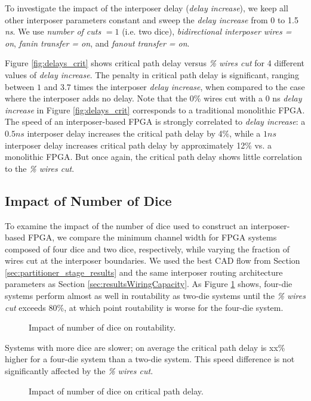 \documentclass[journal]{IEEEtran}
\begin{document}
To investigate the impact of the interposer delay (\textit{delay increase}), we keep all other interposer parameters constant and sweep the \textit{delay increase} from 0 to 1.5 \textit{ns}. We use \textit{number of cuts} $= 1$ (i.e. two dice), \textit{bidirectional interposer wires = on}, \textit{fanin transfer = on}, and \textit{fanout transfer = on}.

Figure \ref{fig:delays_crit} shows critical path delay versus \textit{\% wires cut} for 4 different values of \textit{delay increase}. The penalty in critical path delay is significant, ranging between $1$ and $3.7$ times the interposer \textit{delay increase}, when compared to the case where the interposer adds no delay. Note that the 0\% wires cut with a 0 ns \textit{delay increase} in Figure \ref{fig:delays_crit} corresponds to a traditional monolithic FPGA. The speed of an interposer-based FPGA is strongly correlated to \textit{delay increase}: a $0.5ns$ interposer delay increases the critical path delay by 4\%, while a $1ns$ interposer delay increases critical path delay by approximately 12\% vs. a monolithic FPGA. But once again, the critical path delay shows little correlation to the \textit{\% wires cut}.

\subsection{Impact of Number of Dice}
\label{num_dice_impact}
To examine the impact of the number of dice used to construct an interposer-based FPGA, we compare the minimum channel width for FPGA systems composed of four dice and two dice, respectively, while varying the fraction of wires cut at the interposer boundaries. We used the best CAD flow from Section \ref{sec:partitioner_stage_results} and the same interposer routing architecture parameters as Section \ref{sec:resultsWiringCapacity}. 
As Figure \ref{fig:wires_cut_4part} shows, four-die systems perform almost as well in routability as two-die systems until the \textit{\% wires cut} exceeds 80\%, at which point routability is worse for the four-die system. 

\begin{figure}[!htbp]
\centering

\caption{Impact of number of dice on routability.}
\label{fig:wires_cut_4part}
\end{figure}

Systems with more dice are slower; on average the critical path delay is xx\% higher for a four-die system than a two-die system. This speed difference is not significantly affected by the \textit{\% wires cut}.
\begin{figure}[!htbp]
\centering

\caption{Impact of number of dice on critical path delay.}
\label{fig:crit_path_4part}
\end{figure}
\end{document}
